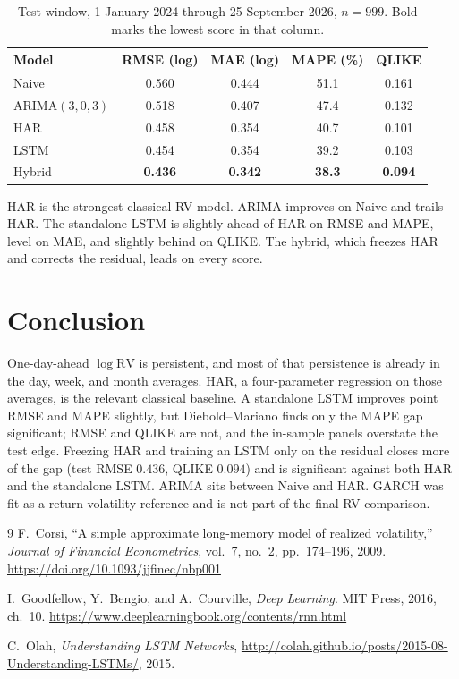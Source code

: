 \documentclass[12pt]{article}
\begin{document}
\begin{table}[H]
\centering
\begin{tabular}{lcccc}
\toprule
Model & RMSE (log) & MAE (log) & MAPE (\%) & QLIKE \\
\midrule
Naive & 0.560 & 0.444 & 51.1 & 0.161 \\
ARIMA\((3,0,3)\) & 0.518 & 0.407 & 47.4 & 0.132 \\
HAR & 0.458 & 0.354 & 40.7 & 0.101 \\
LSTM & 0.454 & 0.354 & 39.2 & 0.103 \\
Hybrid & \textbf{0.436} & \textbf{0.342} & \textbf{38.3} & \textbf{0.094} \\
\bottomrule
\end{tabular}
\caption{Test window, 1 January 2024 through 25 September 2026, \(n=999\). Bold marks the lowest score in that column.}
\end{table}
\begin{explain}
HAR is the strongest classical RV model. ARIMA improves on Naive and trails HAR. The standalone LSTM is slightly ahead of HAR on RMSE and MAPE, level on MAE, and slightly behind on QLIKE. The hybrid, which freezes HAR and corrects the residual, leads on every score.
\end{explain}

\section{Conclusion}
One-day-ahead \(\log\mathrm{RV}\) is persistent, and most of that persistence is already in the day, week, and month averages. HAR, a four-parameter regression on those averages, is the relevant classical baseline. A standalone LSTM improves point RMSE and MAPE slightly, but Diebold--Mariano finds only the MAPE gap significant; RMSE and QLIKE are not, and the in-sample panels overstate the test edge. Freezing HAR and training an LSTM only on the residual closes more of the gap (test RMSE \(0.436\), QLIKE \(0.094\)) and is significant against both HAR and the standalone LSTM. ARIMA sits between Naive and HAR. GARCH was fit as a return-volatility reference and is not part of the final RV comparison.

\clearpage
\begin{thebibliography}{9}
F.~Corsi,
``A simple approximate long-memory model of realized volatility,''
\textit{Journal of Financial Econometrics}, vol.~7, no.~2, pp.~174--196, 2009.
\url{https://doi.org/10.1093/jjfinec/nbp001}

I.~Goodfellow, Y.~Bengio, and A.~Courville,
\textit{Deep Learning}.
MIT Press, 2016,
ch.~10.
\url{https://www.deeplearningbook.org/contents/rnn.html}

C.~Olah,
\textit{Understanding LSTM Networks},
\url{http://colah.github.io/posts/2015-08-Understanding-LSTMs/},
2015.
\end{thebibliography}
\end{document}

